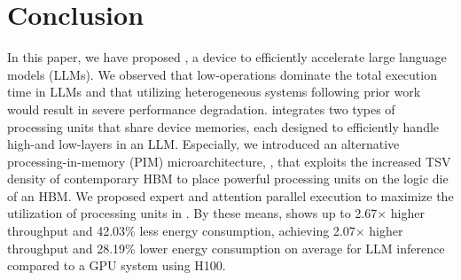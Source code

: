 \section{Conclusion}
\label{sec:conclusion}
In this paper, we have proposed \duplex, a device to efficiently accelerate large language models (LLMs).
We observed that low-\opb operations dominate the total execution time in LLMs and that utilizing heterogeneous systems following prior work would result in severe performance degradation.
\duplex integrates two types of processing units that share device memories, each designed to efficiently handle high-\opb and low-\opb layers in an LLM.
Especially, we introduced an alternative processing-in-memory (PIM) microarchitecture, \lowp, that exploits the increased TSV density of contemporary HBM to place powerful processing units on the logic die of an HBM.
We proposed expert and attention parallel execution to maximize the utilization of processing units in \duplex.
By these means, \duplex shows up to 2.67$\times$ higher throughput and 42.03\% less energy consumption, achieving 2.07$\times$ higher throughput and 28.19\% lower energy consumption on average for LLM inference compared to a GPU system using H100.
